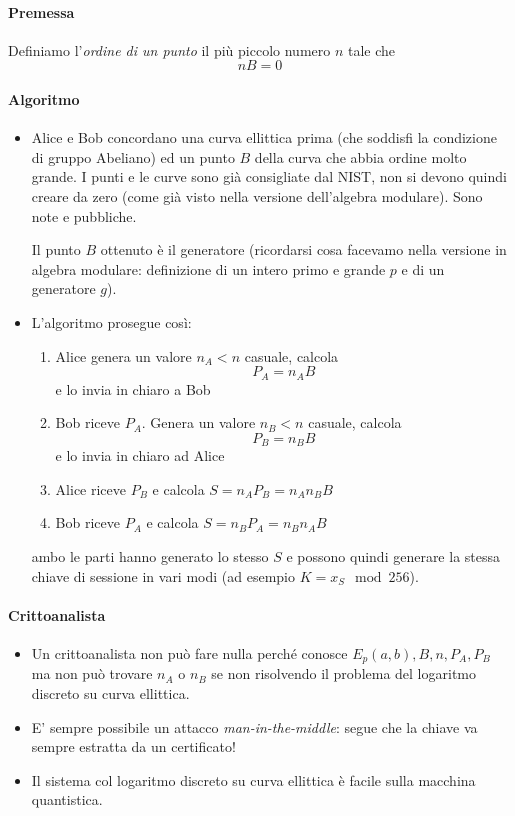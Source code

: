 \paragraph{Premessa} Definiamo l'\emph{ordine di un punto} il più piccolo numero $n$ tale che
$$nB=0$$
\paragraph{Algoritmo}
\begin{itemize}
	\item Alice e Bob concordano una curva ellittica prima (che soddisfi la condizione di gruppo Abeliano) ed un punto $B$ della curva che abbia ordine molto grande. I punti e le curve sono già consigliate dal NIST, non si devono quindi creare da zero (come già visto nella versione dell'algebra modulare). Sono note e pubbliche.
	
	Il punto $B$ ottenuto è il generatore (ricordarsi cosa facevamo nella versione in algebra modulare: definizione di un intero primo e grande $p$ e di un generatore $g$).
	
	\item L'algoritmo prosegue così:
	\begin{enumerate}
		\item Alice genera un valore $n_A < n$ casuale, calcola $$P_A = n_AB$$ e lo invia in chiaro a Bob
		\item Bob riceve $P_A$. Genera un valore $n_B < n$ casuale, calcola $$P_B = n_BB$$ e lo invia in chiaro ad Alice
		\item Alice riceve $P_B$ e calcola $S = n_AP_B = n_An_BB$
		\item Bob riceve $P_A$ e calcola $S = n_BP_A = n_Bn_AB$
	\end{enumerate}
	ambo le parti hanno generato lo stesso $S$ e possono quindi generare la stessa chiave di sessione in vari modi (ad esempio $K = x_S \mod 256$).
\end{itemize}




\paragraph{Crittoanalista}
\begin{itemize}
	\item  Un crittoanalista non può fare nulla perché conosce $E_p(a,b), B, n, P_A, P_B$ ma non può trovare $n_A$ o $n_B$ se non risolvendo il problema del logaritmo discreto su curva ellittica.
	
	\item E' sempre possibile un attacco \emph{man-in-the-middle}: segue che la chiave va sempre estratta da un certificato!
	
	\item Il sistema col logaritmo discreto su curva ellittica è facile sulla macchina quantistica.
\end{itemize}


